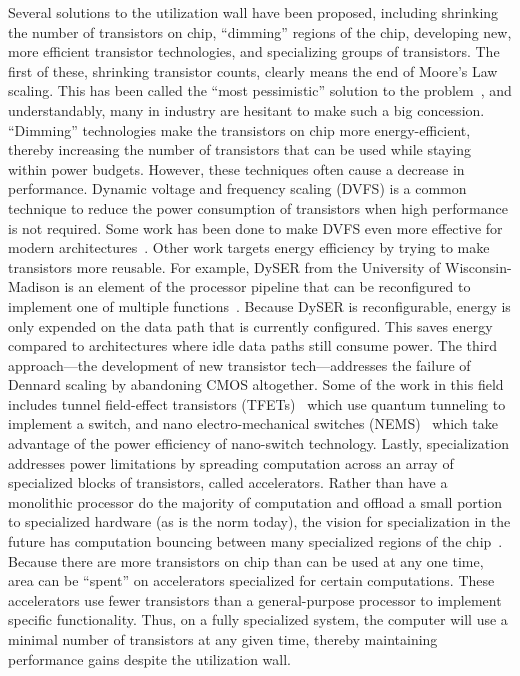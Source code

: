 Several solutions to the utilization wall have been proposed, including shrinking the number of transistors on chip, ``dimming'' regions of the chip, developing new, more efficient transistor technologies, and specializing groups of transistors. The first of these, shrinking transistor counts, clearly means the end of Moore's Law scaling. This has been called the ``most pessimistic'' solution to the problem~\cite{Taylor:2012}, and understandably, many in industry are hesitant to make such a big concession. ``Dimming'' technologies make the transistors on chip more energy-efficient, thereby increasing the number of transistors that can be used while staying within power budgets. However, these techniques often cause a decrease in performance. Dynamic voltage and frequency scaling (DVFS) is a common technique to reduce the power consumption of transistors when high performance is not required. Some work has been done to make DVFS even more effective for modern architectures~\cite{better_dvfs}. Other work targets energy efficiency by trying to make transistors more reusable. For example, DySER from the University of Wisconsin-Madison is an element of the processor pipeline that can be reconfigured to implement one of multiple functions~\cite{dyser}. Because DySER is reconfigurable, energy is only expended on the data path that is currently configured. This saves energy compared to architectures where idle data paths still consume power. The third approach---the development of new transistor tech---addresses the failure of Dennard scaling by abandoning CMOS altogether. Some of the work in this field includes tunnel field-effect transistors (TFETs)~\cite{tfets} which use quantum tunneling to implement a switch, and nano electro-mechanical switches (NEMS)~\cite{nems} which take advantage of the power efficiency of nano-switch technology. Lastly, specialization addresses power limitations by spreading computation across an array of specialized blocks of transistors, called accelerators. Rather than have a monolithic processor do the majority of computation and offload a small portion to specialized hardware (as is the norm today), the vision for specialization in the future has computation bouncing between many specialized regions of the chip~\cite{Taylor:2012}. Because there are more transistors on chip than can be used at any one time, area can be ``spent'' on accelerators specialized for certain computations. These accelerators use fewer transistors than a general-purpose processor to implement specific functionality. Thus, on a fully specialized system, the computer will use a minimal number of transistors at any given time, thereby maintaining performance gains despite the utilization wall.

